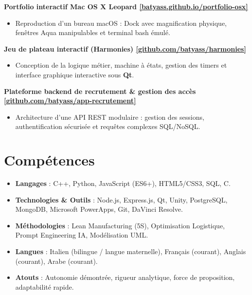 \documentclass[10pt,a4paper]{article}
\newcommand{\projectentry}[1]{%
  \noindent\textbf{#1}\par\vspace{1pt}}
\begin{document}
\projectentry{Portfolio interactif Mac OS X Leopard \hfill \href{https://batyass.github.io/portfolio-osx/}{\small\textcolor{cvblue}{[batyass.github.io/portfolio-osx]}}}
\par\vspace{1pt}
\begin{itemize}
  \item Reproduction d'un bureau macOS : Dock avec magnification physique, fenêtres Aqua manipulables et terminal bash émulé.
\end{itemize}

\projectentry{Jeu de plateau interactif (Harmonies) \hfill \href{https://github.com/batyass/harmonies}{\small\textcolor{cvblue}{[github.com/batyass/harmonies]}}}
\par\vspace{1pt}
\begin{itemize}
  \item Conception de la logique métier, machine à états, gestion des timers et interface graphique interactive sous \textbf{Qt}.
\end{itemize}

\projectentry{Plateforme backend de recrutement \& gestion des accès \hfill \href{https://github.com/batyass/app-recrutement}{\small\textcolor{cvblue}{[github.com/batyass/app-recrutement]}}}
\par\vspace{1pt}
\begin{itemize}
  \item Architecture d'une API REST modulaire : gestion des sessions, authentification sécurisée et requêtes complexes SQL/NoSQL.
\end{itemize}

\section{Compétences}
\begin{itemize}
  \item \textbf{Langages} : C++, Python, JavaScript (ES6+), HTML5/CSS3, SQL, C.
  \item \textbf{Technologies \& Outils} : Node.js, Express.js, Qt, Unity, PostgreSQL, MongoDB, Microsoft PowerApps, Git, DaVinci Resolve.
  \item \textbf{Méthodologies} : Lean Manufacturing (5S), Optimisation Logistique, Prompt Engineering IA, Modélisation UML.
  \item \textbf{Langues} : Italien (bilingue / langue maternelle), Français (courant), Anglais (courant), Arabe (courant).
  \item \textbf{Atouts} : Autonomie démontrée, rigueur analytique, force de proposition, adaptabilité rapide.
\end{itemize}
\end{document}
